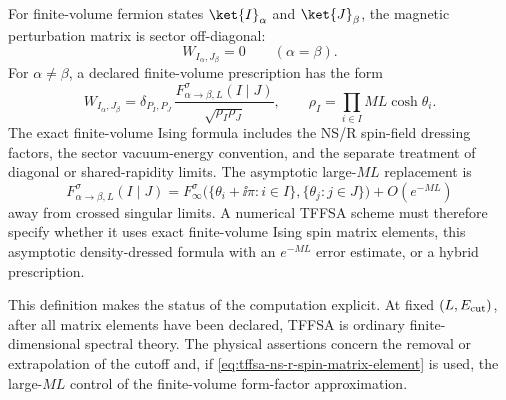 \begin{definition}
\label{def:tffsa-spin-matrix-element}
For finite-volume fermion states \(\ket{I}_\alpha\) and \(\ket{J}_\beta\),
the magnetic perturbation matrix is sector off-diagonal:
\[
  W_{I_\alpha,J_\beta}=0\qquad(\alpha=\beta).
\]
For \(\alpha\ne\beta\), a declared finite-volume prescription has the form
\begin{equation}
  W_{I_\alpha,J_\beta}
  =
  \delta_{P_I,P_J}\,
  \frac{
    F_{\alpha\to\beta,L}^{\sigma}(I\mid J)
  }{
    \sqrt{\rho_I\rho_J}
  },
  \qquad
  \rho_I=\prod_{i\in I}ML\cosh\theta_i .
  \label{eq:tffsa-ns-r-spin-matrix-element}
\end{equation}
The exact finite-volume Ising formula includes the NS/R spin-field dressing
factors, the sector vacuum-energy convention, and the separate treatment of
diagonal or shared-rapidity limits.  The asymptotic large-\(ML\) replacement is
\[
  F_{\alpha\to\beta,L}^{\sigma}(I\mid J)
  =
  F_\infty^\sigma
  \bigl(
    \{\theta_i+\ii\pi:i\in I\},
    \{\theta_j:j\in J\}
  \bigr)
  +O(e^{-ML})
\]
away from crossed singular limits.  A numerical TFFSA scheme must therefore
specify whether it uses exact finite-volume Ising spin matrix elements, this
asymptotic density-dressed formula with an \(e^{-ML}\) error estimate, or a
hybrid prescription.
\end{definition}

This definition makes the status of the computation explicit.  At fixed
\((L,E_{\rm cut})\), after all matrix elements have been declared, TFFSA is
ordinary finite-dimensional spectral theory.  The physical assertions concern
the removal or extrapolation of the cutoff and, if
\eqref{eq:tffsa-ns-r-spin-matrix-element} is used, the large-\(ML\)
control of the finite-volume form-factor approximation.

